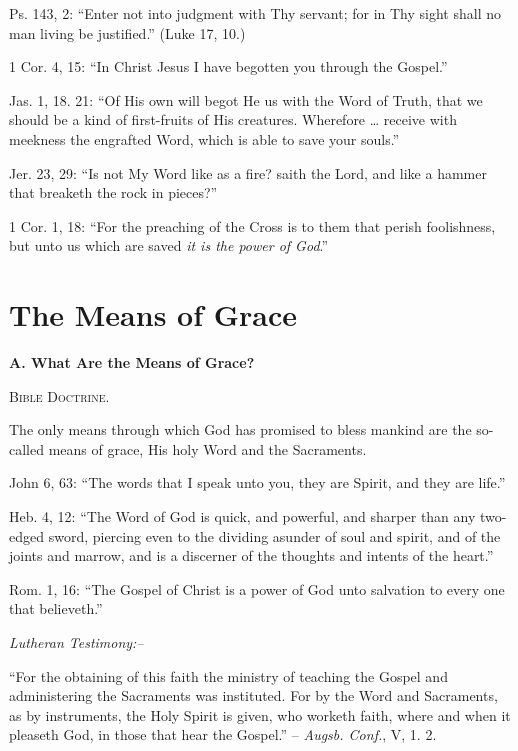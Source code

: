 \documentclass[
]{book}
\begin{document}
Ps. 143, 2: ``Enter not into judgment with Thy servant; for in Thy sight shall no man living be justified.'' (Luke 17, 10.)

1 Cor. 4, 15: ``In Christ Jesus I have begotten you through the Gospel.''

Jas. 1, 18. 21: ``Of His own will begot He us with the Word of Truth, that we should be a kind of first-fruits of His creatures. Wherefore \ldots{} receive with meekness the engrafted Word, which is able to save your souls.''

Jer. 23, 29: ``Is not My Word like as a fire? saith the Lord, and like a hammer that breaketh the rock in pieces?''

1 Cor. 1, 18: ``For the preaching of the Cross is to them that perish foolishness, but unto us which are saved \emph{it is the power of God}.''

\hypertarget{the-means-of-grace}{%
\section*{\texorpdfstring{The Means of Grace}{The Means of Grace}}\label{the-means-of-grace}}

\begin{center}
\textbf{A.  What Are the Means of Grace?}

\textsc{Bible Doctrine.}
\end{center}

The only means through which God has promised to bless mankind are the so-called means of grace, His holy Word and the Sacraments.

John 6, 63: ``The words that I speak unto you, they are Spirit, and they are life.''

Heb. 4, 12: ``The Word of God is quick, and powerful, and sharper than any two-edged sword, piercing even to the dividing asunder of soul and spirit, and of the joints and marrow, and is a discerner of the thoughts and intents of the heart.''

Rom. 1, 16: ``The Gospel of Christ is a power of God unto salvation to every one that believeth.''

\begin{center}
\textsl{Lutheran Testimony:--}
\end{center}

``For the obtaining of this faith the ministry of teaching the Gospel and administering the Sacraments was instituted. For by the Word and Sacraments, as by instruments, the Holy Spirit is given, who worketh faith, where and when it pleaseth God, in those that hear the Gospel.'' -- \emph{Augsb. Conf.}, V, 1. 2.
\end{document}

